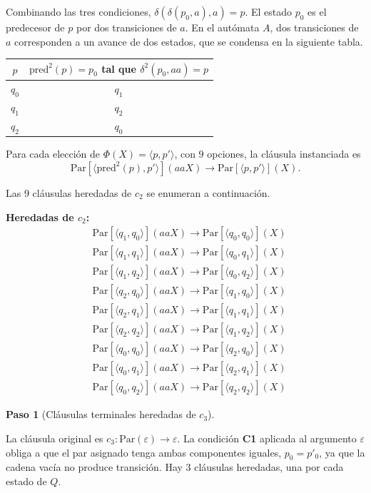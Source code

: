 \documentclass[11pt, letterpaper]{article}
\theoremstyle{definition}
\newtheorem{paso}{Paso}
\newcommand{\eps}{\varepsilon}
\newcommand{\pair}[2]{\langle #1, #2 \rangle}
\newcommand{\trans}{\delta}
\newcommand{\Par}{\mathrm{Par}}
\begin{document}
Combinando las tres condiciones, $\trans(\trans(p_0, a), a) = p$. El estado $p_0$ es el predecesor de $p$ por dos transiciones de $a$. En el autómata $A$, dos transiciones de $a$ corresponden a un avance de dos estados, que se condensa en la siguiente tabla.

\begin{center}
\begin{tabular}{c|c}
$p$ & $\text{pred}^2(p) = p_0$ tal que $\trans^2(p_0, aa) = p$ \\
\hline
$q_0$ & $q_1$ \\
$q_1$ & $q_2$ \\
$q_2$ & $q_0$
\end{tabular}
\end{center}

Para cada elección de $\Phi(X) = \pair{p}{p'}$, con $9$ opciones, la cláusula instanciada es
\[
\Par[\pair{\text{pred}^2(p)}{p'}](aaX) \to \Par[\pair{p}{p'}](X).
\]

Las 9 cláusulas heredadas de $c_2$ se enumeran a continuación.

\begin{tcolorbox}[colback=green!10, colframe=green!50!black]
\textbf{Heredadas de $c_2$:}
\begin{align*}
& \Par[\pair{q_1}{q_0}](aaX) \to \Par[\pair{q_0}{q_0}](X) \\
& \Par[\pair{q_1}{q_1}](aaX) \to \Par[\pair{q_0}{q_1}](X) \\
& \Par[\pair{q_1}{q_2}](aaX) \to \Par[\pair{q_0}{q_2}](X) \\
& \Par[\pair{q_2}{q_0}](aaX) \to \Par[\pair{q_1}{q_0}](X) \\
& \Par[\pair{q_2}{q_1}](aaX) \to \Par[\pair{q_1}{q_1}](X) \\
& \Par[\pair{q_2}{q_2}](aaX) \to \Par[\pair{q_1}{q_2}](X) \\
& \Par[\pair{q_0}{q_0}](aaX) \to \Par[\pair{q_2}{q_0}](X) \\
& \Par[\pair{q_0}{q_1}](aaX) \to \Par[\pair{q_2}{q_1}](X) \\
& \Par[\pair{q_0}{q_2}](aaX) \to \Par[\pair{q_2}{q_2}](X)
\end{align*}
\end{tcolorbox}

\begin{paso}[Cláusulas terminales heredadas de $c_3$]
\end{paso}

La cláusula original es $c_3: \Par(\eps) \to \eps$. La condición \textbf{C1} aplicada al argumento $\eps$ obliga a que el par asignado tenga ambas componentes iguales, $p_0 = p'_0$, ya que la cadena vacía no produce transición. Hay 3 cláusulas heredadas, una por cada estado de $Q$.
\end{document}
